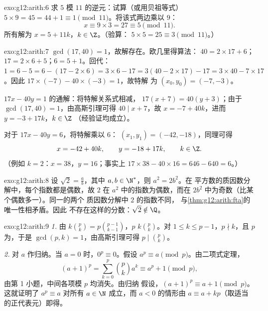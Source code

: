 \begin{solution}{exo:g12:arith:6}
求 $5$ 模 $11$ 的逆元：试算（或用贝祖等式）
$5 \times 9 = 45 = 44 + 1 \equiv 1 \pmod{11}$。将该式两边乘以
$9$：
\[
x \equiv 9 \times 3 = 27 \equiv 5 \pmod{11}.
\]
所有解为 $x = 5 + 11k$，$k \in \Z$。（验算：
$5\times5 = 25 \equiv 3 \pmod{11}$。）
\end{solution}

\begin{solution}{exo:g12:arith:7}
$\gcd(17, 40) = 1$，故解存在。欧几里得算法：
$40 = 2\times17 + 6$；$17 = 2\times6 + 5$；$6 = 5 + 1$。回代：
$1 = 6 - 5 = 6 - (17 - 2\times6) = 3\times6 - 17
= 3(40 - 2\times17) - 17 = 3\times40 - 7\times17$。因此
$17\times(-7) - 40\times(-3) = 1$，故特解
为 $(x_0, y_0) = (-7, -3)$。

 $17x - 40y = 1$ 的通解：将特解关系式相减，
$17(x + 7) = 40(y + 3)$；由于 $\gcd(17, 40) = 1$，由高斯引理可得
$40 \mid x + 7$，故 $x = -7 + 40k$，进而 $y = -3 + 17k$，$k \in \Z$
（经验证均成立）。

对于 $17x - 40y = 6$，将特解乘以 $6$：
$(x_1, y_1) = (-42, -18)$，同理可得
\[
x = -42 + 40k, \qquad y = -18 + 17k, \qquad k \in \Z .
\]
（例如 $k = 2$：$x = 38$，$y = 16$；事实上 $17\times38 - 40\times16
= 646 - 640 = 6$。）
\end{solution}

\begin{solution}{exo:g12:arith:8}
设 $\sqrt2 = \frac ab$，其中 $a, b \in \N^*$，则 $a^2 = 2b^2$。在
平方数的质因数分解中，每个指数都是偶数，故
$2$ 在 $a^2$ 中的指数为偶数，而在 $2b^2$ 中为奇数（比某个偶数多一）。同一的两个
质因数分解中 $2$ 的指数不同，
与\cref{thm:g12:arith:fta}的唯一性相矛盾。因此
不存在这样的分数：$\sqrt2 \notin \Q$。
\end{solution}

\begin{solution}{exo:g12:arith:9}
\emph{1.} 由 $k\binom pk = p \binom{p-1}{k-1}$，$p$ 
$k\binom pk$。对 $1 \leq k \leq p-1$，$p \nmid k$，且 $p$ 为，于是
$\gcd(p, k) = 1$，由高斯引理可得 $p \mid \binom pk$。

\emph{2.} 对 $a$ 作归纳。当 $a = 0$ 时，$0^p \equiv 0$。假设
$a^p \equiv a \pmod p$。由二项式定理，
\[
(a+1)^p = \sum_{k=0}^{p} \binom pk a^k
\equiv a^p + 1 \pmod p,
\]
由第 1 小题，中间各项模 $p$ 均消失。由归纳
假设，$(a+1)^p \equiv a + 1 \pmod p$。这就证明了
$a^p \equiv a$ 对所有 $a \in \N$ 成立，而 $a < 0$ 的情形由
$a \equiv a + kp$（取适当的正代表元）即得。
\end{solution}


